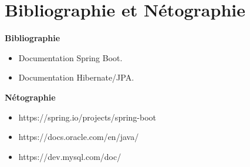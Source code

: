 \chapter*{Bibliographie et Nétographie}

\textbf{Bibliographie}
\begin{itemize}
  \item [1] Documentation Spring Boot.
  \item [2] Documentation Hibernate/JPA.
\end{itemize}

\textbf{Nétographie}
\begin{itemize}
  \item https://spring.io/projects/spring-boot
  \item https://docs.oracle.com/en/java/
  \item https://dev.mysql.com/doc/
\end{itemize}
